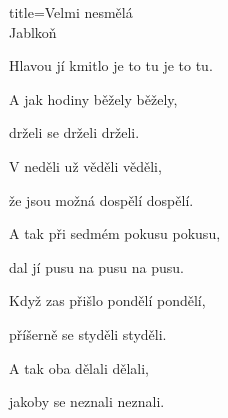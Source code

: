 \begin{song}{title=\centering Velmi nesmělá \\\normalsize Jablkoň  \vspace*{-0.3cm}}
{\begin{minipage}[t]{0.48\textwidth}
	Hlavou jí kmitlo je to tu je to tu.
	
	A jak hodiny běžely běžely,
	
	drželi se drželi drželi.

\end{minipage}\begin{minipage}[t]{0.48\textwidth}\setlength{\parindent}{0.45cm}\vspace*{0.55cm}  %

	
\sloka
	V neděli už věděli věděli,

	že jsou možná dospělí dospělí.
	
	A tak při sedmém pokusu pokusu,
	
	dal jí pusu na pusu na pusu.


\sloka
	Když zas přišlo pondělí pondělí,
	
	příšerně se styděli styděli.
	
	A tak oba dělali dělali,
	
	jakoby se neznali neznali.

\end{minipage}
}
\setcounter{Slokočet}{0}
\end{song}
